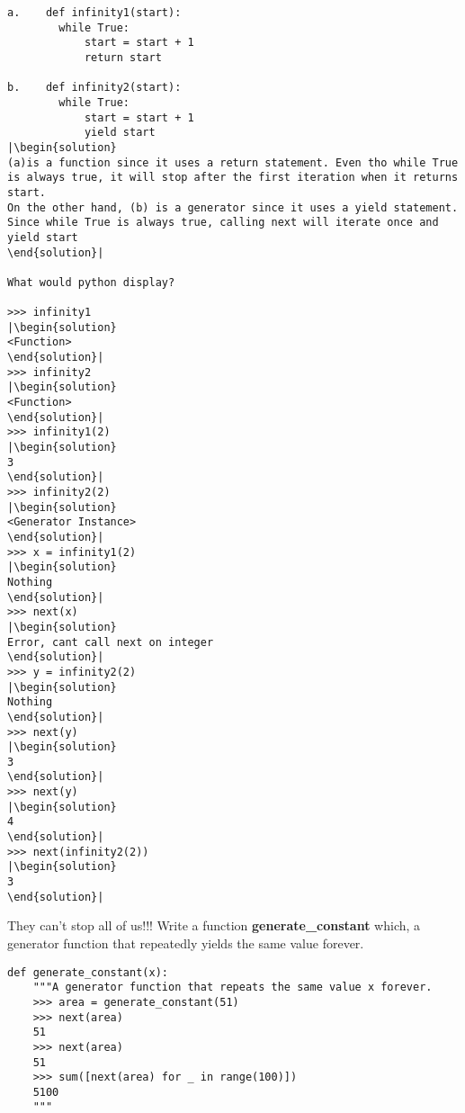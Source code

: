 \begin{lstlisting}
a.    def infinity1(start):
		while True:
			start = start + 1
			return start

b.    def infinity2(start):
		while True:
			start = start + 1
			yield start			
|\begin{solution}
(a)is a function since it uses a return statement. Even tho while True is always true, it will stop after the first iteration when it returns start.
On the other hand, (b) is a generator since it uses a yield statement. Since while True is always true, calling next will iterate once and yield start
\end{solution}|

What would python display?

>>> infinity1
|\begin{solution}
<Function>
\end{solution}|
>>> infinity2
|\begin{solution}
<Function>
\end{solution}|
>>> infinity1(2)
|\begin{solution}
3
\end{solution}|
>>> infinity2(2)
|\begin{solution}
<Generator Instance>
\end{solution}|
>>> x = infinity1(2)
|\begin{solution}
Nothing
\end{solution}|
>>> next(x)
|\begin{solution}
Error, cant call next on integer
\end{solution}|
>>> y = infinity2(2)
|\begin{solution}
Nothing
\end{solution}|
>>> next(y)
|\begin{solution}
3
\end{solution}|
>>> next(y)
|\begin{solution}
4
\end{solution}|
>>> next(infinity2(2))
|\begin{solution}
3	
\end{solution}|
\end{lstlisting}
\newpage



\question
They can't stop all of us!!! Write a function \textbf{generate\_constant} which, a generator function that repeatedly yields the same value forever.

\begin{lstlisting}
def generate_constant(x):
	"""A generator function that repeats the same value x forever.
	>>> area = generate_constant(51)
	>>> next(area)
	51
	>>> next(area)
	51
	>>> sum([next(area) for _ in range(100)])
	5100
	"""
	
	
	
	
	
	
\end{lstlisting}

